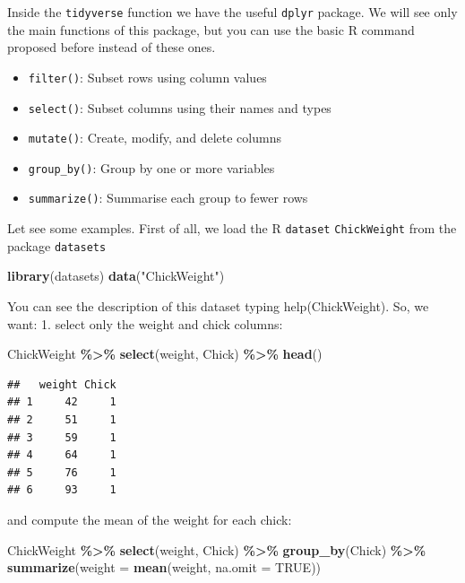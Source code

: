 \documentclass[
]{article}
\newenvironment{Shaded}{\begin{snugshade}}{\end{snugshade}}
\newcommand{\AttributeTok}[1]{\textcolor[rgb]{0.13,0.29,0.53}{#1}}
\newcommand{\ConstantTok}[1]{\textcolor[rgb]{0.56,0.35,0.01}{#1}}
\newcommand{\FunctionTok}[1]{\textcolor[rgb]{0.13,0.29,0.53}{\textbf{#1}}}
\newcommand{\NormalTok}[1]{#1}
\newcommand{\SpecialCharTok}[1]{\textcolor[rgb]{0.81,0.36,0.00}{\textbf{#1}}}
\newcommand{\StringTok}[1]{\textcolor[rgb]{0.31,0.60,0.02}{#1}}
\providecommand{\tightlist}{%
  \setlength{\itemsep}{0pt}\setlength{\parskip}{0pt}}
\begin{document}
Inside the \texttt{tidyverse} function we have the useful \texttt{dplyr}
package. We will see only the main functions of this package, but you
can use the basic R command proposed before instead of these ones.

\begin{itemize}
\tightlist
\item
  \texttt{filter()}: Subset rows using column values
\item
  \texttt{select()}: Subset columns using their names and types
\item
  \texttt{mutate()}: Create, modify, and delete columns
\item
  \texttt{group\_by()}: Group by one or more variables
\item
  \texttt{summarize()}: Summarise each group to fewer rows
\end{itemize}

Let see some examples. First of all, we load the R \texttt{dataset}
\texttt{ChickWeight} from the package \texttt{datasets}

\begin{Shaded}
\begin{Highlighting}[]
\FunctionTok{library}\NormalTok{(datasets)}
\FunctionTok{data}\NormalTok{(}\StringTok{"ChickWeight"}\NormalTok{)}
\end{Highlighting}
\end{Shaded}

You can see the description of this dataset typing help(ChickWeight).
So, we want: 1. select only the weight and chick columns:

\begin{Shaded}
\begin{Highlighting}[]
\NormalTok{ChickWeight }\SpecialCharTok{\%\textgreater{}\%} \FunctionTok{select}\NormalTok{(weight, Chick) }\SpecialCharTok{\%\textgreater{}\%} \FunctionTok{head}\NormalTok{()}
\end{Highlighting}
\end{Shaded}

\begin{verbatim}
##   weight Chick
## 1     42     1
## 2     51     1
## 3     59     1
## 4     64     1
## 5     76     1
## 6     93     1
\end{verbatim}

and compute the mean of the weight for each chick:

\begin{Shaded}
\begin{Highlighting}[]
\NormalTok{ChickWeight }\SpecialCharTok{\%\textgreater{}\%} \FunctionTok{select}\NormalTok{(weight, Chick) }\SpecialCharTok{\%\textgreater{}\%}
  \FunctionTok{group\_by}\NormalTok{(Chick) }\SpecialCharTok{\%\textgreater{}\%}
  \FunctionTok{summarize}\NormalTok{(}\AttributeTok{weight =} \FunctionTok{mean}\NormalTok{(weight, }\AttributeTok{na.omit =} \ConstantTok{TRUE}\NormalTok{))}
\end{Highlighting}
\end{Shaded}
\end{document}
